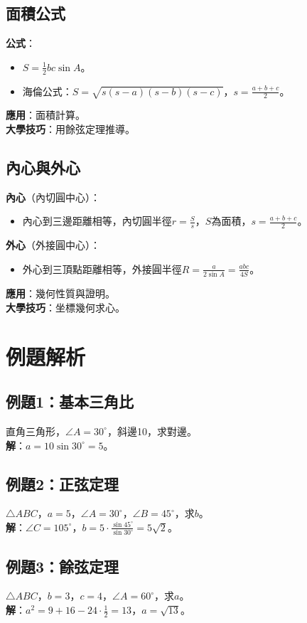 \subsection{面積公式}
\textbf{公式}：
\begin{itemize}
    \item $S = \frac{1}{2}bc \sin A$。
    \item 海倫公式：$S = \sqrt{s(s-a)(s-b)(s-c)}$，$s = \frac{a+b+c}{2}$。
\end{itemize}
\textbf{應用}：面積計算。\\
\textbf{大學技巧}：用餘弦定理推導。

\subsection{內心與外心}
\textbf{內心}（內切圓中心）：
\begin{itemize}
    \item 內心到三邊距離相等，內切圓半徑$r = \frac{S}{s}$，$S$為面積，$s = \frac{a+b+c}{2}$。
\end{itemize}
\textbf{外心}（外接圓中心）：
\begin{itemize}
    \item 外心到三頂點距離相等，外接圓半徑$R = \frac{a}{2 \sin A} = \frac{abc}{4S}$。
\end{itemize}
\textbf{應用}：幾何性質與證明。\\
\textbf{大學技巧}：坐標幾何求心。

\section{例題解析}

\subsection{例題1：基本三角比}
直角三角形，$\angle A=30^\circ$，斜邊10，求對邊。\\
\textbf{解}：$a = 10 \sin 30^\circ = 5$。

\subsection{例題2：正弦定理}
$\triangle ABC$，$a=5$，$\angle A=30^\circ$，$\angle B=45^\circ$，求$b$。\\
\textbf{解}：$\angle C = 105^\circ$，$b = 5 \cdot \frac{\sin 45^\circ}{\sin 30^\circ} = 5\sqrt{2}$。

\subsection{例題3：餘弦定理}
$\triangle ABC$，$b=3$，$c=4$，$\angle A=60^\circ$，求$a$。\\
\textbf{解}：$a^2 = 9 + 16 - 24 \cdot \frac{1}{2} = 13$，$a = \sqrt{13}$。

